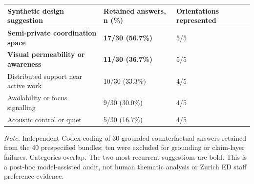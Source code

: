 \begin{tabular}{lll}
\toprule
\textbf{Synthetic design suggestion} & \textbf{Retained answers, n (\%)} & \textbf{Orientations represented} \\
\midrule
\textbf{Semi-private coordination space} & \textbf{17/30 (56.7\%)} & 5/5 \\
\textbf{Visual permeability or awareness} & \textbf{11/30 (36.7\%)} & 5/5 \\
Distributed support near active work & 10/30 (33.3\%) & 4/5 \\
Availability or focus signalling & 9/30 (30.0\%) & 4/5 \\
Acoustic control or quiet & 5/30 (16.7\%) & 4/5 \\
\bottomrule
\end{tabular}

\par\footnotesize\textit{Note.} Independent Codex coding of 30 grounded counterfactual answers retained from the 40 prespecified bundles; ten were excluded for grounding or claim-layer failures. Categories overlap. The two most recurrent suggestions are bold. This is a post-hoc model-assisted audit, not human thematic analysis or Zurich ED staff preference evidence.
